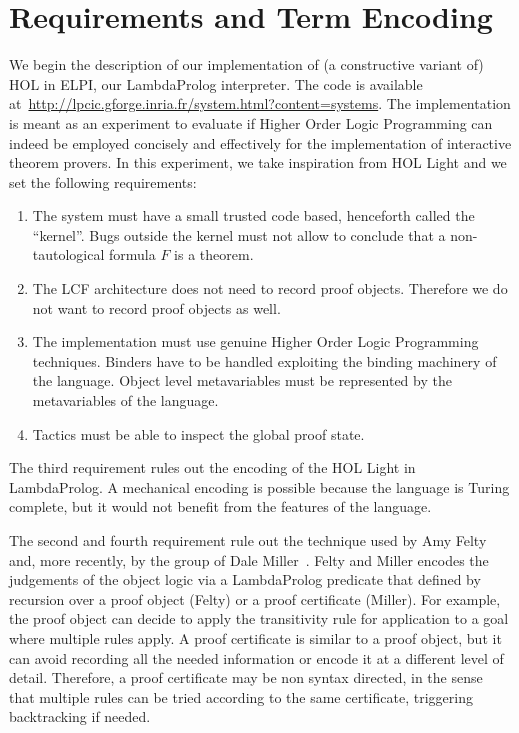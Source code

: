 \documentclass[preprint]{sigplanconf}
\begin{document}
\section{Requirements and Term Encoding}
We begin the description of our implementation of (a constructive variant of)
HOL in ELPI, our LambdaProlog interpreter. The code is available at~\url{http://lpcic.gforge.inria.fr/system.html?content=systems}. The implementation is meant as an experiment to evaluate if Higher Order Logic Programming can indeed be employed concisely and effectively for the implementation of interactive theorem provers. In this experiment, we take inspiration from HOL Light and we set the following requirements:
\begin{enumerate}
\item The system must have a small trusted code based, henceforth called the ``kernel''. Bugs outside the kernel must not allow to conclude that a non-tautological formula $F$ is a theorem.
\item The LCF architecture does not need to record proof objects. Therefore we do not want to record proof objects as well.
\item The implementation must use genuine Higher Order Logic Programming techniques. Binders have to be handled exploiting the binding machinery of the language. Object level metavariables must be represented by the metavariables of the language.
\item Tactics must be able to inspect the global proof state.
\end{enumerate}

The third requirement rules out the encoding of the HOL Light in LambdaProlog. A mechanical encoding is possible because the language is Turing complete, but it would not benefit from the features of the language.

The second and fourth requirement rule out the technique used by Amy Felty and, more recently, by the group of Dale Miller~\cite{miller3}. Felty and Miller encodes the judgements of the object logic via a LambdaProlog predicate that defined by recursion over a proof object (Felty) or a proof certificate (Miller).
For example, the proof object can decide to apply the transitivity rule for application to a goal where multiple rules apply. A proof certificate is similar to a proof object, but it can avoid recording all the needed information or encode it at a different level of detail. Therefore, a proof certificate may be non syntax directed, in the sense that multiple rules can be tried according to the same certificate, triggering backtracking if needed.
\end{document}
